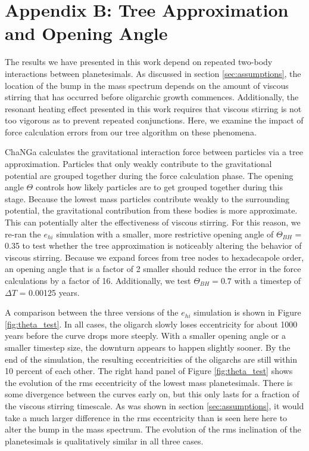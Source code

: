 \section{Appendix B: Tree Approximation and Opening Angle}\label{sec:openAngle}

The results we have presented in this work depend on repeated two-body interactions between planetesimals. As discussed in 
section \ref{sec:assumptions}, the location of the bump in the mass spectrum depends on the amount of viscous stirring that 
has occurred before oligarchic growth commences. Additionally, the resonant heating effect presented in this work requires that 
viscous stirring is not too vigorous as to prevent repeated conjunctions. Here, we examine the impact of force calculation errors 
from our tree algorithm on these phenomena.

{\sc ChaNGa} calculates the gravitational interaction force between particles via a tree approximation. Particles that only weakly 
contribute to the gravitational potential are grouped together during the force calculation phase. The opening angle $\Theta$ 
controls how likely particles are to get grouped together during this stage. Because the lowest mass particles contribute weakly 
to the surrounding potential, the gravitational contribution from these bodies is more approximate. This can potentially alter the 
effectiveness of viscous stirring. For this reason, we re-ran the $e_{hi}$ simulation with a smaller, more restrictive opening 
angle of $\Theta_{BH}$ = 0.35 to test whether the tree approximation is noticeably altering the behavior of viscous stirring. 
Because we expand forces from tree nodes to hexadecapole order, an opening angle that is a factor of 2 smaller should reduce 
the error in the force calculations by a factor of 16. Additionally, we test $\Theta_{BH} = 0.7$ with a timestep of $\Delta T$ = 
0.00125 years.

A comparison between the three versions of the $e_{hi}$ simulation is shown in Figure \ref{fig:theta_test}. In all cases, the 
oligarch slowly loses eccentricity for about 1000 years before the curve drops more steeply. With a smaller opening angle or a 
smaller timestep size, the downturn appears to happen slightly sooner. By the end of the simulation, the resulting eccentricities 
of the oligarchs are still within 10 percent of each other. The right hand panel of Figure \ref{fig:theta_test} shows the evolution of 
the rms eccentricity of the lowest mass planetesimals. There is some divergence between the curves early on, but this only 
lasts for a fraction of the viscous stirring timescale. As was shown in section \ref{sec:assumptions}, it would take a much larger 
difference in the rms eccentricity than is seen here here to alter the bump in the mass spectrum. The evolution of the rms 
inclination of the planetesimals is qualitatively similar in all three cases.